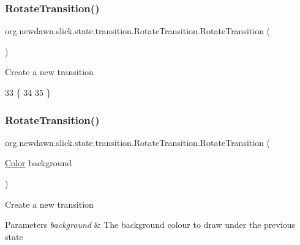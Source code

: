 \subsubsection{\texorpdfstring{Rotate\+Transition()}{RotateTransition()}\hspace{0.1cm}{\footnotesize\ttfamily [1/2]}}
{\footnotesize\ttfamily org.\+newdawn.\+slick.\+state.\+transition.\+Rotate\+Transition.\+Rotate\+Transition (\begin{DoxyParamCaption}{ }\end{DoxyParamCaption})\hspace{0.3cm}{\ttfamily [inline]}}

Create a new transition 
\begin{DoxyCode}
33                               \{
34         
35     \}
\end{DoxyCode}
\mbox{\label{classorg_1_1newdawn_1_1slick_1_1state_1_1transition_1_1_rotate_transition_aefa7546ffe542346a0ca65349381651e}} 
\subsubsection{\texorpdfstring{Rotate\+Transition()}{RotateTransition()}\hspace{0.1cm}{\footnotesize\ttfamily [2/2]}}
{\footnotesize\ttfamily org.\+newdawn.\+slick.\+state.\+transition.\+Rotate\+Transition.\+Rotate\+Transition (\begin{DoxyParamCaption}\item[{\mbox{\hyperlink{classorg_1_1newdawn_1_1slick_1_1_color}{Color}}}]{background }\end{DoxyParamCaption})\hspace{0.3cm}{\ttfamily [inline]}}

Create a new transition


\begin{DoxyParams}{Parameters}
{\em background} & The background colour to draw under the previous state \\
\hline
\end{DoxyParams}

